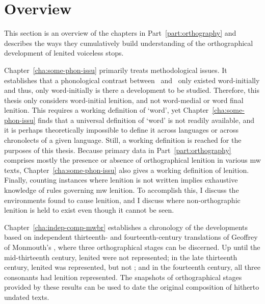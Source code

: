 \Textcite{Sch_Geminatespellings01}%

\Textcite{Rus_Scribalconsistency09} %

\section{Overview}
\label{sec:overview}

This section is an overview of the chapters in Part~\ref{part:orthography} and describes the ways they  cumulatively build understanding of the orthographical development of lenited voiceless stops.

Chapter~\ref{cha:some-phon-issu} primarily treats methodological issues. It establishes that a phonological contrast between \lT\ and \xD\ only existed word-initially and thus, only word-initially is there a development to be studied. Therefore, this thesis  only considers word-initial lenition, and not word-medial or word final lenition. This requires a working definition of `word', yet Chapter~\ref{cha:some-phon-issu} finds that a universal definition of `word' is not readily available, and it is perhaps theoretically impossible to define it across languages or across chronolects of a given language. Still, a working definition is reached for the purposes of this thesis. Because primary data in Part~\ref{part:orthography} comprises mostly the presence or absence of orthographical lenition in various \gls{mw} texts,  Chapter~\ref{cha:some-phon-issu} also gives a working definition of lenition. Finally, counting instances where lenition is not written implies exhaustive knowledge of rules governing \gls{mw} lenition. To accomplish this, I discuss the environments  found to cause lenition, and I discuss where
non-orthographic lenition is held to exist even though it cannot be seen.

Chapter~\ref{cha:indep-comp-mwbr} establishes a chronology of the developments based on independent thirteenth- and fourteenth-century translations of Geoffrey of Monmouth's , where three orthographical stages can be discerned. Up until the mid-thirteenth century, lenited  were not represented; in the late thirteenth century, lenited  was represented, but not ; and in the fourteenth century, all three consonants had lenition represented. The snapshots of orthographical stages provided by these results can be used to date the original composition of hitherto undated texts.

